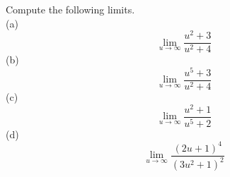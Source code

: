 Compute the following limits.\\
(a)
\begin{equation*}
  \lim_{u\rightarrow \infty} \frac{u^2+3}{u^2+4}
\end{equation*}
(b)
\begin{equation*}
  \lim_{u\rightarrow \infty} \frac{u^5+3}{u^2+4}
\end{equation*}
(c)
\begin{equation*}
  \lim_{u\rightarrow \infty} \frac{u^2+1}{u^5+2}
\end{equation*}
(d)
\begin{equation*}
  \lim_{u\rightarrow \infty} \frac{(2u+1)^4}{(3u^2+1)^2}
\end{equation*}
\answercheck
